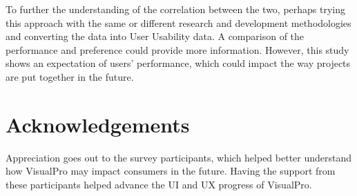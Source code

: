 \documentclass[a0,portrait]{a0poster}
\begin{document}
\begin{multicols}{2}
To further the understanding of the correlation between the two, perhaps trying this approach with the same or different research and development methodologies and converting the data into User Usability data. A comparison of the performance and preference could provide more information. However, this study shows an expectation of users' performance, which could impact the way projects are put together in the future. 

\nocite{*} %


\section*{Acknowledgements}
Appreciation goes out to the survey participants, which helped better understand how VisualPro may impact consumers in the future. Having the support from these participants helped advance the UI and UX progress of VisualPro.


\end{multicols}
\end{document}
